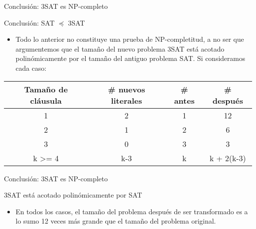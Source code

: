 \documentclass[10pt, mathserif, profesionalfont]{beamer}
\begin{document}
\begin{frame}{Conclusión: 3SAT es NP-completo}
\begin{block}{Conclusión: SAT $\preceq$ 3SAT}
\begin{itemize}
\item{Todo lo anterior no constituye una prueba de NP-completitud, a no ser que argumentemos que el tamaño del nuevo problema 3SAT está acotado polinómicamente por el tamaño del antiguo problema SAT. \newline \newline Si consideramos cada caso:}
\end{itemize}
\begin{table}[]
\centering

\begin{tabular}{cccc}
\hline
\multicolumn{1}{|c|}{\textbf{Tamaño de cláusula}} & \multicolumn{1}{c|}{\textbf{\# nuevos literales}} & \multicolumn{1}{c|}{\textbf{\# antes}} & \multicolumn{1}{c|}{\textbf{\# después}} \\ \hline
1                                                 & 2                                                 & 1                                      & 12                                       \\
2                                                 & 1                                                 & 2                                      & 6                                        \\
3                                                 & 0                                                 & 3                                      & 3                                        \\
k \textgreater= 4                                 & k-3                                               & k                                      & k + 2(k-3)
\end{tabular}
\end{table}
\end{block}

\end{frame}

\begin{frame}{Conclusión: 3SAT es NP-completo}
\begin{block}{3SAT está acotado polinómicamente por SAT}
\begin{itemize}
\item En todos los casos, el tamaño del problema después de ser transformado es a lo sumo 12 veces más grande que el tamaño del problema original.
\end{itemize}
\end{block}

\end{frame}
\end{document}
